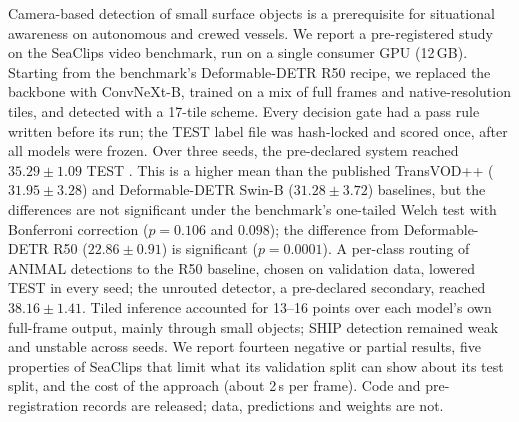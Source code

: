 Camera-based detection of small surface objects is a prerequisite for situational awareness on autonomous and crewed vessels.
We report a pre-registered study on the SeaClips video benchmark, run on a single consumer GPU (12\,GB).
Starting from the benchmark's Deformable-DETR R50 recipe, we replaced the backbone with ConvNeXt-B, trained on a mix of full frames and native-resolution tiles, and detected with a 17-tile scheme.
Every decision gate had a pass rule written before its run; the TEST label file was hash-locked and scored once, after all models were frozen.
Over three seeds, the pre-declared system reached $35.29 \pm 1.09$ TEST \mapthree{}. This is a higher mean than the published TransVOD++ ($31.95 \pm 3.28$) and Deformable-DETR Swin-B ($31.28 \pm 3.72$) baselines, but the differences are not significant under the benchmark's one-tailed Welch test with Bonferroni correction ($p = 0.106$ and $0.098$); the difference from Deformable-DETR R50 ($22.86 \pm 0.91$) is significant ($p = 0.0001$).
A per-class routing of ANIMAL detections to the R50 baseline, chosen on validation data, lowered TEST \mapthree{} in every seed; the unrouted detector, a pre-declared secondary, reached $38.16 \pm 1.41$.
Tiled inference accounted for 13--16 points over each model's own full-frame output, mainly through small objects; SHIP detection remained weak and unstable across seeds.
We report fourteen negative or partial results, five properties of SeaClips that limit what its validation split can show about its test split, and the cost of the approach (about 2\,s per frame). Code and pre-registration records are released; data, predictions and weights are not.
